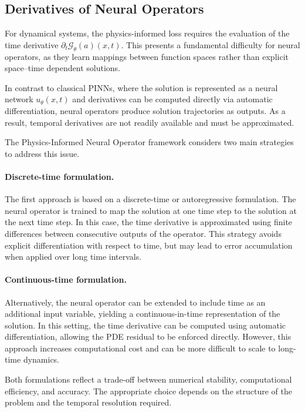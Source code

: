 \documentclass[final,1p,times]{elsarticle}
\theoremstyle{definition}
\newcommand{\Gt}{\mathcal{G}_{\theta}}
\begin{document}
\subsection{Derivatives of Neural Operators}

For dynamical systems, the physics-informed loss requires the evaluation of the time derivative
\(
\partial_t \Gt(a)(x,t)
\).
This presents a fundamental difficulty for neural operators, as they learn mappings between function spaces rather than explicit space--time dependent solutions.

In contrast to classical PINNs, where the solution is represented as a neural network $u_\theta(x,t)$ and derivatives can be computed directly via automatic differentiation, neural operators produce solution trajectories as outputs. As a result, temporal derivatives are not readily available and must be approximated.

The Physics-Informed Neural Operator framework considers two main strategies to address this issue.

\paragraph{Discrete-time formulation.}
The first approach is based on a discrete-time or autoregressive formulation. The neural operator is trained to map the solution at one time step to the solution at the next time step. In this case, the time derivative is approximated using finite differences between consecutive outputs of the operator. This strategy avoids explicit differentiation with respect to time, but may lead to error accumulation when applied over long time intervals.

\paragraph{Continuous-time formulation.}
Alternatively, the neural operator can be extended to include time as an additional input variable, yielding a continuous-in-time representation of the solution. In this setting, the time derivative can be computed using automatic differentiation, allowing the PDE residual to be enforced directly. However, this approach increases computational cost and can be more difficult to scale to long-time dynamics.

Both formulations reflect a trade-off between numerical stability, computational efficiency, and accuracy. The appropriate choice depends on the structure of the problem and the temporal resolution required.
\end{document}
